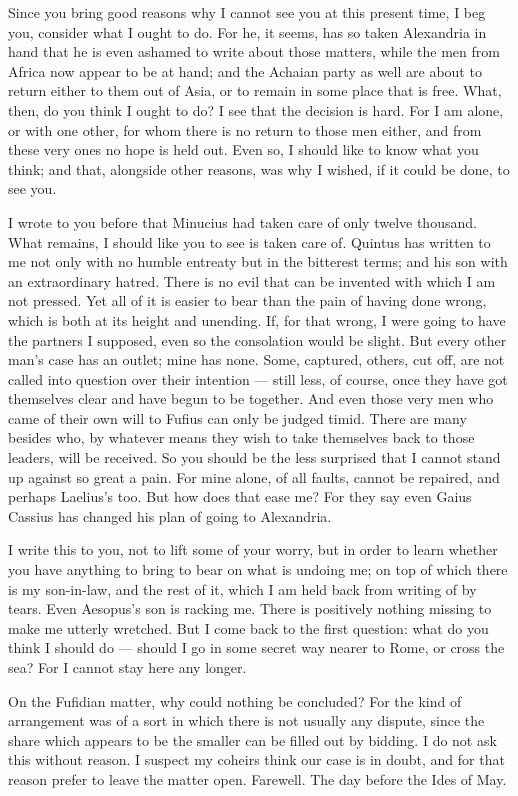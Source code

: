 

 Since you bring good reasons why I cannot see you at this present time, I beg you, consider what I ought to do. For he, it seems, has so taken Alexandria in hand that he is even ashamed to write about those matters, while the men from Africa now appear to be at hand; and the Achaian party as well are about to return either to them out of Asia, or to remain in some place that is free. What, then, do you think I ought to do? I see that the decision is hard. For I am alone, or with one other, for whom there is no return to those men either, and from these very ones no hope is held out. Even so, I should like to know what you think; and that, alongside other reasons, was why I wished, if it could be done, to see you.

 I wrote to you before that Minucius had taken care of only twelve thousand. What remains, I should like you to see is taken care of. Quintus has written to me not only with no humble entreaty but in the bitterest terms; and his son with an extraordinary hatred. There is no evil that can be invented with which I am not pressed. Yet all of it is easier to bear than the pain of having done wrong, which is both at its height and unending. If, for that wrong, I were going to have the partners I supposed, even so the consolation would be slight. But every other man's case has an outlet; mine has none. Some, captured, others, cut off, are not called into question over their intention --- still less, of course, once they have got themselves clear and have begun to be together. And even those very men who came of their own will to Fufius can only be judged timid. There are many besides who, by whatever means they wish to take themselves back to those leaders, will be received. So you should be the less surprised that I cannot stand up against so great a pain. For mine alone, of all faults, cannot be repaired, and perhaps Laelius's too. But how does that ease me? For they say even Gaius Cassius has changed his plan of going to Alexandria.

 I write this to you, not \dag to lift some of your worry\dag, but in order to learn whether you have anything to bring to bear on what is undoing me; on top of which there is my son-in-law, and the rest of it, which I am held back from writing of by tears. Even Aesopus's son is racking me. There is positively nothing missing to make me utterly wretched. But I come back to the first question: what do you think I should do --- should I go in some secret way nearer to Rome, or cross the sea? For I cannot stay here any longer.

 On the Fufidian matter, why could nothing be concluded? For the kind of arrangement was of a sort in which there is not usually any dispute, since the share which appears to be the smaller can be filled out by bidding. I do not ask this without reason. I suspect my coheirs think our case is in doubt, and for that reason prefer to leave the matter open. Farewell. The day before the Ides of May.
